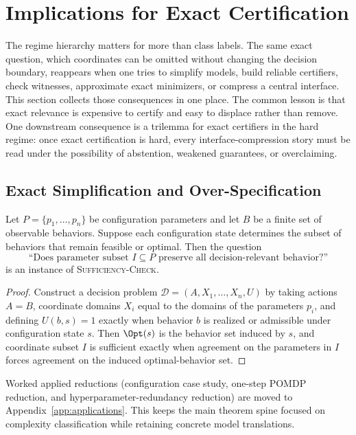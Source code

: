 \section{Implications for Exact Certification}\label{sec:engineering-corollaries}

The regime hierarchy matters for more than class labels. The same exact question, which coordinates can be omitted without changing the decision boundary, reappears when one tries to simplify models, build reliable certifiers, check witnesses, approximate exact minimizers, or compress a central interface. This section collects those consequences in one place. The common lesson is that exact relevance is expensive to certify and easy to displace rather than remove. One downstream consequence is a trilemma for exact certifiers in the hard regime: once exact certification is hard, every interface-compression story must be read under the possibility of abstention, weakened guarantees, or overclaiming.

\subsection{Exact Simplification and Over-Specification}

\begin{proposition}
\label{prop:config-sufficiency}
Let $P=\{p_1,\ldots,p_n\}$ be configuration parameters and let $B$ be a finite set of observable behaviors. Suppose each configuration state determines the subset of behaviors that remain feasible or optimal. Then the question
\[
\text{``Does parameter subset } I \subseteq P \text{ preserve all decision-relevant behavior?''}
\]
is an instance of \textnormal{\textsc{Sufficiency-Check}}.
\end{proposition}


\begin{proof}
Construct a decision problem $\mathcal{D}=(A,X_1,\ldots,X_n,U)$ by taking actions $A=B$, coordinate domains $X_i$ equal to the domains of the parameters $p_i$, and defining $U(b,s)=1$ exactly when behavior $b$ is realized or admissible under configuration state $s$. Then $\Opt(s)$ is the behavior set induced by $s$, and coordinate subset $I$ is sufficient exactly when agreement on the parameters in $I$ forces agreement on the induced optimal-behavior set.
\end{proof}

Worked applied reductions (configuration case study, one-step POMDP reduction, and hyperparameter-redundancy reduction) are moved to Appendix~\ref{app:applications}. This keeps the main theorem spine focused on complexity classification while retaining concrete model translations.


